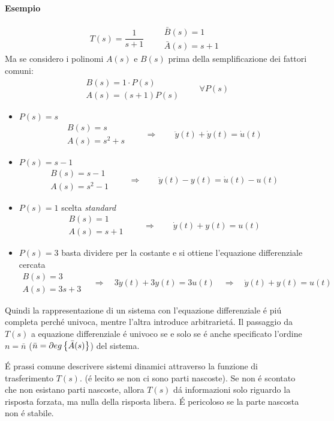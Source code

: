 \documentclass[../main.tex]{subfiles}
\begin{document}
		\begin{mdframed}[style=Esempio]
			\paragraph{Esempio}
			\[
				T(s) = \frac{1}{s+1} \qquad 
				\begin{array}{l} 
					\bar{B}(s) = 1
					\\
					\bar{A}(s) = s+1 
				\end{array}
			\]
			Ma se considero i polinomi $ A(s) $ e $ B(s) $ prima della semplificazione dei fattori comuni:
			\[ 
				\begin{array}{l} B(s) = 1 \cdot P(s)\\ A(s) = (s+1)P(s) \end{array} \qquad \forall P(s) 
			\]
			\begin{itemize}
				\item
					$ P(s) = s $
					\[
						\begin{array}{l}
							B(s) = s
							\\
							A(s) = s^2+s
						\end{array} 
						\qquad\Rightarrow\qquad
						\ddot{y}(t) + \dot y(t) = \dot u(t)
					\]
				\item 
					$ P(s) = s-1 $
					\[ 
						\begin{array}{l} 
							B(s) = s-1
							\\
							A(s) = s^2-1
						\end{array} 
						\qquad\Rightarrow\qquad 
						\ddot{y}(t) - y(t) = \dot{u}(t) - u(t)
					\]
				\item 
					$ P(s) = 1 $ scelta \textit{standard}
					\[
						\begin{array}{l} 
							B(s) = 1
							\\
							A(s) = s+1 
						\end{array} 
						\qquad\Rightarrow\qquad 
						\dot{y}(t) + y(t) = u(t)
					\]
				\item 
					$ P(s) = 3 $ basta dividere per la costante e si ottiene l'equazione differenziale cercata
					\[
						\begin{array}{l}
							B(s) = 3
							\\
							A(s) = 3s+3
						\end{array} 
						\quad\Rightarrow\quad 
						3 \dot{y}(t) + 3y(t) = 3u(t) 
						\quad\Rightarrow\quad 
						\dot{y}(t) + y(t) = u(t)
					\]
			\end{itemize}
			Quindi la rappresentazione di un sistema con l'equazione differenziale \'{e} pi\'u completa perch\'e univoca, mentre l'altra introduce arbitrariet\'a. Il passaggio da $ T(s) $ a equazione differenziale \'e univoco se e solo se \'e anche specificato l'ordine $ n = \bar n $ ($ \bar n = \partial eg \left\lbrace \bar A(s) \right\rbrace $) del sistema.
			
			\'E prassi comune descrivere sistemi dinamici attraverso la funzione di trasferimento $ T(s) $. (\'e lecito se non ci sono parti nascoste). Se non \'e scontato che non esistano parti nascoste, allora $ T(s) $ d\'a informazioni solo riguardo la risposta forzata, ma nulla della risposta libera. \'E pericoloso se la parte nascosta non \'e stabile.
		\end{mdframed}
		
\end{document}
